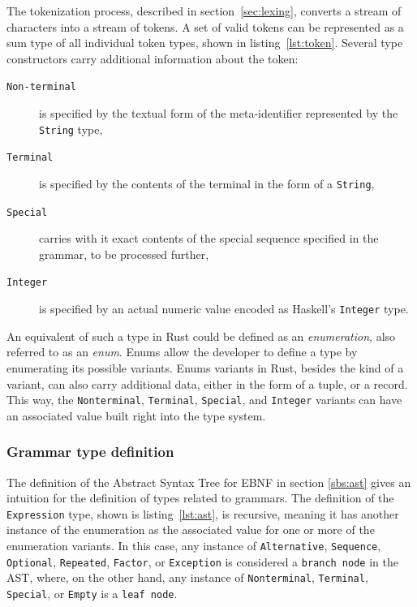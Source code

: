 \documentclass[english,engineering]{wizthesis}
\begin{document}

The tokenization process, described in section~\ref{sec:lexing}, converts a
stream of characters into a stream of tokens. A set of valid tokens can be
represented as a sum type of all individual token types, shown in
listing~\ref{lst:token}. Several type constructors carry additional information
about the token:
\begin{description}
  \item[\texttt{Non-terminal}] is specified by the textual form of the
  meta-identifier represented by the \texttt{String} type,
  \item[\texttt{Terminal}] is specified by the contents of the terminal in the
  form of a \texttt{String},
  \item[\texttt{Special}] carries with it exact contents of the special
  sequence specified in the grammar, to be processed further,
  \item[\texttt{Integer}] is specified by an actual numeric value encoded as
  Haskell's \texttt{Integer} type.
\end{description}

An equivalent of such a type in Rust could be defined as an \emph{enumeration},
also referred to as an \emph{enum}. Enums allow the developer to define a type
by enumerating its possible variants. Enums variants in Rust, besides the kind
of a variant, can also carry additional data, either in the form of a tuple, or
a record. This way, the \texttt{Nonterminal}, \texttt{Terminal},
\texttt{Special}, and \texttt{Integer} variants can have an associated value
built right into the type system.

\newpage

\subsubsection*{Grammar type definition}

The definition of the Abstract Syntax Tree for EBNF in section \ref{sbs:ast}
gives an intuition for the definition of types related to grammars. The
definition of the \texttt{Expression} type, shown is listing~\ref{lst:ast}, is
recursive, meaning it has another instance of the enumeration as the associated
value for one or more of the enumeration variants. In this case, any instance of
\texttt{Alternative}, \texttt{Sequence}, \texttt{Optional}, \texttt{Repeated},
\texttt{Factor}, or \texttt{Exception} is considered a \texttt{branch node} in
the AST, where, on the other hand, any instance of \texttt{Nonterminal},
\texttt{Terminal}, \texttt{Special}, or \texttt{Empty} is a \texttt{leaf node}.
\end{document}
